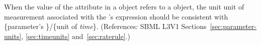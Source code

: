 When the value of the attribute  in a \RateRule object
refers to a \Parameter object, the unit unit of measurement associated with
the \RateRule's  expression should be consistent with
\{parameter's \}/\{unit of \emph{time}\}. (References: SBML
L3V1 Sections~\ref{sec:parameter-units}, \ref{sec:timeunits}
and~\ref{sec:raterule}.)
